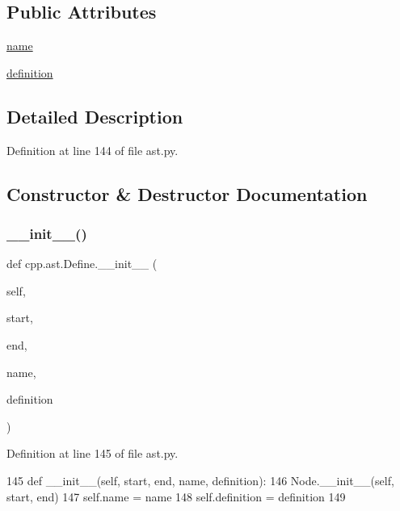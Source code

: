 \subsection*{Public Attributes}
\begin{DoxyCompactItemize}
\item 
\hyperlink{classcpp_1_1ast_1_1Define_a8879216f09e88f79d7baa49bcfa10ebd}{name}
\item 
\hyperlink{classcpp_1_1ast_1_1Define_a0c636652dfeb2f15e62793afea1153c9}{definition}
\end{DoxyCompactItemize}


\subsection{Detailed Description}


Definition at line 144 of file ast.\+py.



\subsection{Constructor \& Destructor Documentation}
\mbox{\label{classcpp_1_1ast_1_1Define_ae9af61866e010a863ba9f8818ec8924c}} 
\subsubsection{\texorpdfstring{\+\_\+\+\_\+init\+\_\+\+\_\+()}{\_\_init\_\_()}}
{\footnotesize\ttfamily def cpp.\+ast.\+Define.\+\_\+\+\_\+init\+\_\+\+\_\+ (\begin{DoxyParamCaption}\item[{}]{self,  }\item[{}]{start,  }\item[{}]{end,  }\item[{}]{name,  }\item[{}]{definition }\end{DoxyParamCaption})}



Definition at line 145 of file ast.\+py.


\begin{DoxyCode}
145     \textcolor{keyword}{def }\_\_init\_\_(self, start, end, name, definition):
146         Node.\_\_init\_\_(self, start, end)
147         self.name = name
148         self.definition = definition
149 
\end{DoxyCode}


